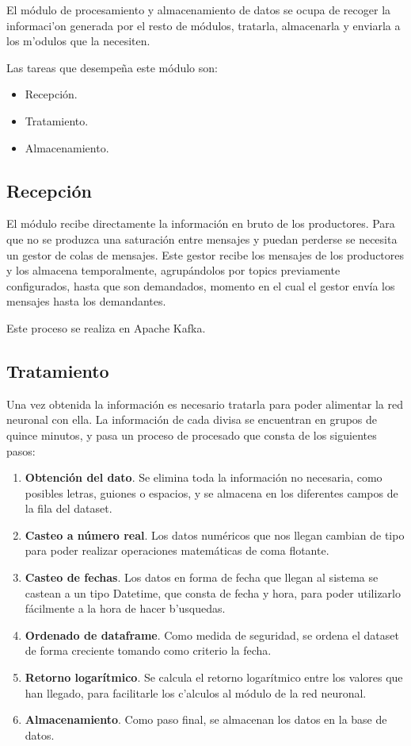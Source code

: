 El módulo de procesamiento y almacenamiento de datos se ocupa de recoger la informaci'on generada por el resto de módulos, tratarla, almacenarla y enviarla a los m'odulos que la necesiten.

Las tareas que desempeña este módulo son:
\begin{itemize}
\item Recepción.
\item Tratamiento.
\item Almacenamiento.
\end{itemize}

\subsection{Recepción}
El módulo recibe directamente la información en bruto de los productores. Para que no se produzca una saturación entre mensajes y puedan perderse se necesita un gestor de colas de mensajes. Este gestor recibe los mensajes de los productores y los almacena temporalmente, agrupándolos por topics previamente configurados, hasta que son demandados, momento en el cual el gestor envía los mensajes hasta los demandantes.

Este proceso se realiza en Apache Kafka.

\subsection{Tratamiento}
Una vez obtenida la información es necesario tratarla para poder alimentar la red neuronal con ella. La información de cada divisa se encuentran en grupos de quince minutos, y pasa un proceso de procesado que consta de los siguientes pasos:
\begin{enumerate}
\item \textbf{Obtención del dato}. Se elimina toda la información no necesaria, como posibles letras, guiones o espacios, y se almacena en los diferentes campos de la fila del dataset. 
\item \textbf{Casteo a número real}. Los datos numéricos que nos llegan cambian de tipo para poder realizar operaciones matemáticas de coma flotante.
\item \textbf{Casteo de fechas}. Los datos en forma de fecha que llegan al sistema se castean a un tipo Datetime, que consta de fecha y hora, para poder utilizarlo fácilmente a la hora de hacer b'usquedas.
\item \textbf{Ordenado de dataframe}. Como medida de seguridad, se ordena el dataset de forma creciente tomando como criterio la fecha.
\item \textbf{Retorno logarítmico}. Se calcula el retorno logarítmico entre los valores que han llegado, para facilitarle los c'alculos al módulo de la red neuronal.
\item \textbf{Almacenamiento}. Como paso final, se almacenan los datos en la base de datos.

\end{enumerate}

